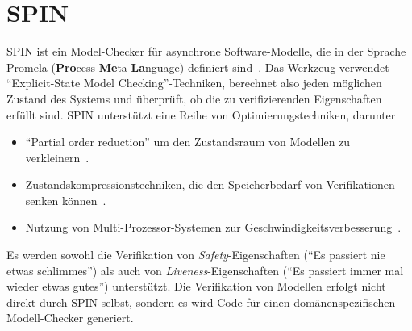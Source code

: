 \section{SPIN}
\label{sec:spin}
SPIN ist ein Model-Checker für asynchrone Software-Modelle, die in der Sprache Promela ({\bf Pro}cess {\bf Me}ta {\bf La}nguage) definiert sind~\cite{spinbook}.
Das Werkzeug verwendet "`Explicit-State Model Checking"'-Techniken, berechnet also jeden möglichen Zustand des Systems und überprüft, ob die zu verifizierenden Eigenschaften erfüllt sind.
SPIN unterstützt eine Reihe von Optimierungstechniken, darunter
\begin{itemize}
\item "`Partial order reduction"' um den Zustandsraum von Modellen zu verkleinern~\cite{partial_order_reduction}.
\item Zustandskompressionstechniken, die den Speicherbedarf von Verifikationen senken können~\cite{spin_state_compression}.
\item Nutzung von Multi-Prozessor-Systemen zur Geschwindigkeitsverbesserung~\cite{spin_multi_core}.
\end{itemize}
Es werden sowohl die Verifikation von \emph{Safety}-Eigenschaften ("`Es passiert nie etwas schlimmes"') als auch von \emph{Liveness}-Eigenschaften ("`Es passiert immer mal wieder etwas gutes"') unterstützt.
Die Verifikation von Modellen erfolgt nicht direkt durch SPIN selbst, sondern es wird Code für einen domänenspezifischen Modell-Checker generiert.